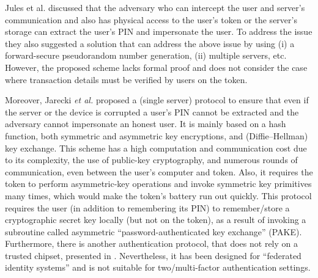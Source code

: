 \begin{enumerate}

Jules et al. \cite{juels2016configurable} discussed that the adversary who can intercept the user and server's communication and also has physical access to the user's token or the server's storage can extract the user's PIN and impersonate the user. To address the issue they also suggested a solution that can address the above issue by using (i) a forward-secure pseudorandom number generation, (ii) multiple servers, etc. However, the proposed scheme lacks formal proof and does not consider the case where transaction details must be verified by users on the token.  

Moreover, Jarecki \textit{et al.} \cite{JareckiJKSS21} proposed a (single server) protocol to ensure that even if the server or the device is corrupted a user's PIN cannot be extracted and the adversary cannot impersonate an honest user. It is mainly based on a hash function, both symmetric and asymmetric key encryptions, and (Diffie–Hellman) key exchange. This scheme has a high computation and communication cost due to its complexity,  the use of public-key cryptography, and numerous rounds of communication, even between the user's computer and token. Also, it requires the token to perform asymmetric-key operations and invoke symmetric key primitives many times, which would make the token's battery run out quickly. This protocol requires the user (in addition to remembering its PIN) to remember/store a cryptographic secret key locally (but not on the token), as a result of invoking a subroutine called asymmetric  ``password-authenticated key exchange'' (PAKE). Furthermore, there is another authentication protocol, that does not rely on a trusted chipset, presented in \cite{zhang2020strong}. Nevertheless, it has been designed for ``federated identity systems'' and is not suitable for two/multi-factor authentication settings. 








\end{enumerate}
